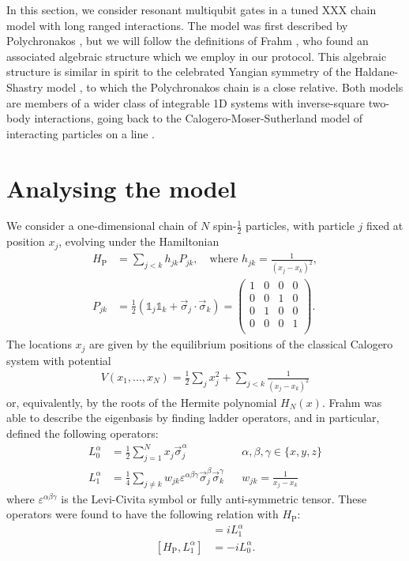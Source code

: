
In this section, we consider resonant multiqubit gates in a tuned XXX chain model with long ranged interactions. 
The model was first described by Polychronakos \cite{Polychronakos1993}, but we will follow the definitions of Frahm \cite{Frahm1993}, who found an associated algebraic structure which we employ in our protocol. This algebraic structure is similar in spirit to the celebrated Yangian symmetry of the Haldane-Shastry model \cite{Haldane1988,Shastry1988,Haldane1992}, to which the Polychronakos chain is a close relative. Both models are members of a wider class of integrable 1D systems with inverse-square two-body interactions, going back to the Calogero-Moser-Sutherland model of interacting particles on a line \cite{Calogero1969, Calogero1969a,  Calogero1971, Sutherland1971, Sutherland1972, Sutherland1975, Moser1975}.

\section{Analysing the model}
We consider a one-dimensional chain of $N$ spin-$\frac{1}{2}$ particles, with particle $j$ fixed at position $x_j$, evolving under the Hamiltonian 
\begin{align*}
H_\text{P} &= \sum_{j<k} h_{jk} P_{jk}, \quad  \text{where \ } h_{jk} = \frac{1}{(x_j - x_k)^2}, \\
P_{jk} &= \frac{1}{2} \left( \mathds{1}_{j} \mathds{1}_{k} + \vec{\sigma}_j \cdot \vec{\sigma}_k  \right) 
= \begin{pmatrix}
1 & 0 & 0 & 0 \\
0 & 0 & 1 & 0 \\
0 & 1 & 0 & 0 \\
0 & 0 & 0 & 1 \\
\end{pmatrix}.
\end{align*}  
The locations $x_j$ are given by the equilibrium positions of the classical Calogero system with potential 
\begin{align*}
V(x_1, ..., x_N) = \frac{1}{2} \sum_j x^2_j + \sum_{j<k} \frac{1}{(x_j - x_k)^2}
\end{align*}
or, equivalently, by the roots of the Hermite polynomial $H_N(x)$. Frahm was able to describe the eigenbasis by finding ladder operators, and in particular, defined the following operators:
\begin{align*}
L_0^\alpha &= \frac{1}{2} \sum_{j=1}^{N} x_j \vec{\sigma}_j^\alpha  		&& \alpha, \beta, \gamma  \in \{ x,y,z \}\\
L_1^\alpha &= \frac{1}{4} \sum_{j \neq k} w_{jk} \varepsilon^{\alpha \beta \gamma} \vec{\sigma}_j^\beta \vec{\sigma}_k^\gamma 	&& w_{jk} = \frac{1}{x_j - x_k}  
\end{align*}
%
where $\varepsilon^{\alpha \beta \gamma}$ is the Levi-Civita symbol or fully anti-symmetric tensor. These operators were found to have the following relation with $H_\text{P}$:
  \begin{align*}
  [ H_\text{P},  L_0^\alpha ] &= i L_1^\alpha \\
  [ H_\text{P},  L_1^\alpha ] &= -i L_0^\alpha.
  \end{align*}


